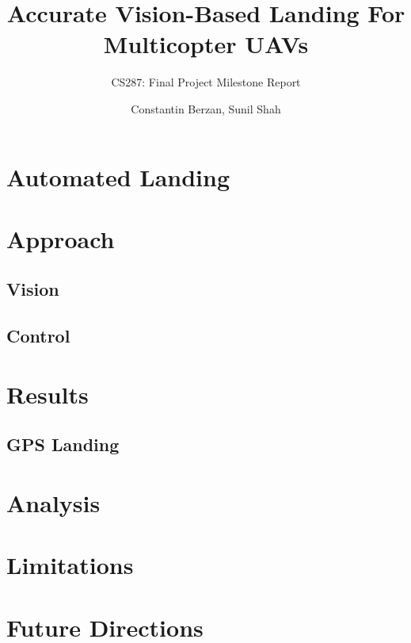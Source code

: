\documentclass[10pt, twocolumn]{scrartcl} %
\title{Accurate Vision-Based Landing For Multicopter UAVs}
\subtitle{CS287: Final Project Milestone Report}
\author{Constantin Berzan, Sunil Shah}
\date{}
\begin{document}
\maketitle

\begin{abstract}
\end{abstract}
\section{Automated Landing}


\section{Approach}


\subsection{Vision}

\subsection{Control}


\section{Results}

\subsection{GPS Landing}

\section{Analysis}

\section{Limitations}

\section{Future Directions}
\end{document}
